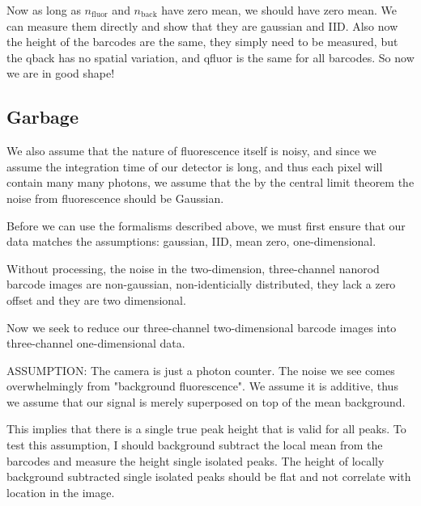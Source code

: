 Now as long as $n_{\text{fluor}}$ and $n_{\text{back}}$ have zero mean, we should have zero mean. We can measure them directly and show that they are gaussian and IID. Also now  the height of the barcodes are the same, they simply need to be measured, but the qback has no spatial variation, and qfluor is the same for all barcodes. So now we are in good shape!



\subsection{Garbage	} 

We also assume that the nature of fluorescence itself is noisy, and since we assume the integration time of our detector is long, and thus each pixel will contain many many photons, we assume that the by the central limit theorem the noise from fluorescence should be Gaussian.






Before we can use the formalisms described above, we must first ensure that our data matches the assumptions: gaussian, IID, mean zero, one-dimensional. 

Without processing, the noise in the two-dimension, three-channel nanorod barcode images are non-gaussian, non-identicially distributed, they lack a zero offset and they are two dimensional.



Now we seek to reduce our three-channel two-dimensional barcode images into three-channel one-dimensional data. 








ASSUMPTION: The camera is just a photon counter. The noise we see comes overwhelmingly from "background fluorescence". We assume it is additive, thus we assume that our signal is merely superposed on top of the mean background. 

This implies that there is a single true peak height that is valid for all peaks. To test this assumption, I should background subtract the local mean from the barcodes and measure the height single isolated peaks. The height of locally background subtracted single isolated peaks should be flat and not correlate with location in the image.

